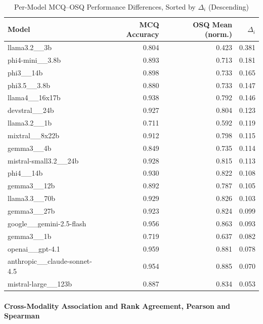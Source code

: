 \begin{table}[htbp]
\centering
\caption{Per-Model MCQ--OSQ Performance Differences, Sorted by $\Delta_i$ (Descending)}
\label{tab:per_model_deltas}
\footnotesize
\begin{tabular}{lrrr}
\toprule
Model & MCQ Accuracy & OSQ Mean (norm.) & $\Delta_i$ \\
\midrule
llama3.2\_\_3b                      & 0.804 & 0.423 & 0.381 \\
phi4-mini\_\_3.8b                   & 0.893 & 0.713 & 0.181 \\
phi3\_\_14b                         & 0.898 & 0.733 & 0.165 \\
phi3.5\_\_3.8b                      & 0.880 & 0.733 & 0.147 \\
llama4\_\_16x17b                    & 0.938 & 0.792 & 0.146 \\
devstral\_\_24b                     & 0.927 & 0.804 & 0.123 \\
llama3.2\_\_1b                      & 0.711 & 0.592 & 0.119 \\
mixtral\_\_8x22b                    & 0.912 & 0.798 & 0.115 \\
gemma3\_\_4b                        & 0.849 & 0.735 & 0.114 \\
mistral-small3.2\_\_24b             & 0.928 & 0.815 & 0.113 \\
phi4\_\_14b                         & 0.930 & 0.822 & 0.108 \\
gemma3\_\_12b                       & 0.892 & 0.787 & 0.105 \\
llama3.3\_\_70b                     & 0.929 & 0.826 & 0.103 \\
gemma3\_\_27b                       & 0.923 & 0.824 & 0.099 \\
google\_\_gemini-2.5-flash          & 0.956 & 0.863 & 0.093 \\
gemma3\_\_1b                        & 0.719 & 0.637 & 0.082 \\
openai\_\_gpt-4.1                   & 0.959 & 0.881 & 0.078 \\
anthropic\_\_claude-sonnet-4.5      & 0.954 & 0.885 & 0.070 \\
mistral-large\_\_123b               & 0.887 & 0.834 & 0.053 \\
\bottomrule
\end{tabular}
\end{table}



\paragraph{Cross-Modality Association and Rank Agreement, Pearson and Spearman}

